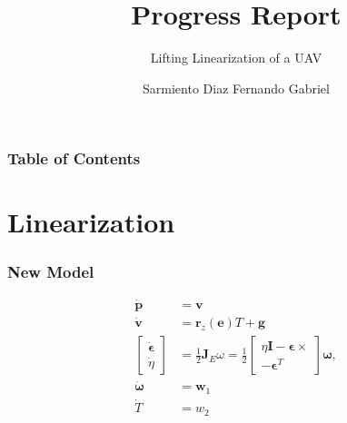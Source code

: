 \documentclass{beamer}
\title[Progress Report] %
{Progress Report}
\subtitle{Lifting Linearization of a UAV}
\author[Sarmiento Fernando] %
{Sarmiento Diaz Fernando Gabriel}
\institute[TITECH] %
{
  \inst{1}%
  Yamakita Laboratory\\
  Department of Systems and Control Engineering\\
  Tokyo Institute of Technology
}
\date[2021] %
\begin{document}
\frame{\titlepage}


\begin{frame}
    \frametitle{Table of Contents}
    \tableofcontents
\end{frame}


\section{Linearization}

\begin{frame}
    \frametitle{New Model}
    \begin{equation}
        \begin{aligned}
            \dot{\boldsymbol{p}}                   & =\boldsymbol{v}                                                                                               \\
            \dot{\boldsymbol{v}}                   & =\boldsymbol{r}_{z}(\boldsymbol{e}) T+\boldsymbol{g}                                                          \\
            \left[\begin{array}{c}
                    \dot{\boldsymbol{\epsilon}} \\
                    \dot{\eta}
                \end{array}\right] & =\frac{1}{2} \boldsymbol{J}_{E} \omega=\frac{1}{2}\left[\begin{array}{c}
                    \eta \boldsymbol{I}-\boldsymbol{\epsilon} \times \\
                    -\boldsymbol{\epsilon}^{T}
                \end{array}\right] \boldsymbol{\omega}, \\
            \dot{\boldsymbol{\omega}}              & =\boldsymbol{w}_{1}                                                                                           \\
            \dot{T}                                & =w_{2}
        \end{aligned}
    \end{equation}


\end{frame}
\end{document}
